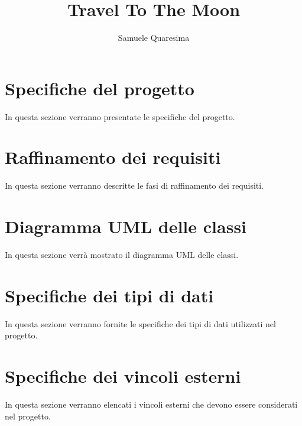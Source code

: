 \documentclass{article}
\title{Travel To The Moon}
\author{Samuele Quaresima}
\date{}
\begin{document}
\maketitle

\section{Specifiche del progetto}

In questa sezione verranno presentate le specifiche del progetto.

\section{Raffinamento dei requisiti}

In questa sezione verranno descritte le fasi di raffinamento dei requisiti.

\section{Diagramma UML delle classi}

In questa sezione verrà mostrato il diagramma UML delle classi.

\section{Specifiche dei tipi di dati}

In questa sezione verranno fornite le specifiche dei tipi di dati utilizzati nel progetto.

\section{Specifiche dei vincoli esterni}

In questa sezione verranno elencati i vincoli esterni che devono essere considerati nel progetto.
\end{document}
